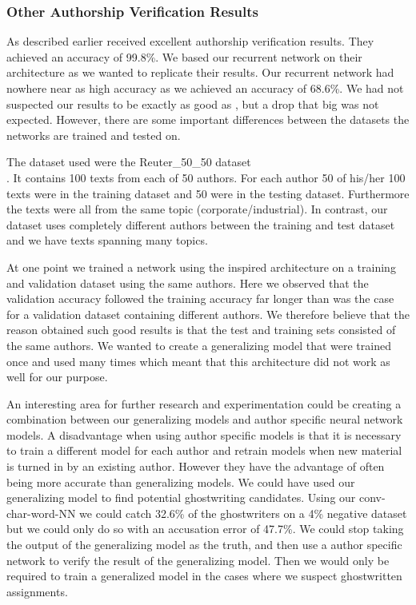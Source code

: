 \subsubsection{Other Authorship Verification Results}
\label{subsubsec:other_authorship_verification_results}

As described earlier \citet{qian:2018} received excellent authorship
verification results. They achieved an accuracy of 99.8\%. We based our
recurrent network on their architecture as we wanted to replicate their results.
Our recurrent network had nowhere near as high accuracy as we achieved an
accuracy of 68.6\%. We had not suspected our results to be exactly as good as
\citet{qian:2018}, but a drop that big was not expected. However, there are some
important differences between the datasets the networks are trained and tested
on.

The dataset \citet{qian:2018} used were the Reuter\_50\_50 dataset
\\\citep{Dua:2017}. It contains 100 texts from each of 50 authors. For each
author 50 of his/her 100 texts were in the training dataset and 50 were in
the testing dataset. Furthermore the texts were all from the same topic
(corporate/industrial). In contrast, our dataset uses completely different
authors between the training and test dataset and we have texts spanning many
topics.


At one point we trained a network using the \citet{qian:2018} inspired
architecture on a training and validation dataset using the same authors. Here
we observed that the validation accuracy followed the training accuracy far
longer than was the case for a validation dataset containing different authors.
We therefore believe that the reason \citet{qian:2018} obtained such good
results is that the test and training sets consisted of the same authors. We
wanted to create a generalizing model that were trained once and used many times
which meant that this architecture did not work as well for our purpose.

An interesting area for further research and experimentation could be creating
a combination between our generalizing models and author specific neural network
models. A disadvantage when using author specific models is that it is necessary
to train a different model for each author and retrain models when new
material is turned in by an existing author. However they have the advantage
of often being more accurate than generalizing models. We could have used
our generalizing model to find potential ghostwriting candidates. Using our
\gls{conv-char-word-NN} we could catch 32.6\% of the ghostwriters on a 4\%
negative dataset but we could only do so with an accusation error of 47.7\%. We
could stop taking the output of the generalizing model as the truth, and then
use a author specific network to verify the result of the generalizing model.
Then we would only be required to train a generalized model in the cases where
we suspect ghostwritten assignments.


